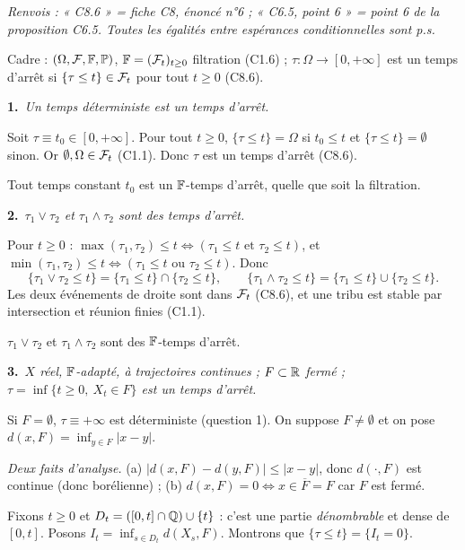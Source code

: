 \documentclass[11pt,a4paper]{article}
\newcommand{\question}[2]{\par\medskip\noindent\textbf{#1}~\textit{#2}\par\smallskip}
\begin{document}

\textit{Renvois : « C8.6 » = fiche C8, énoncé n°6 ; « C6.5, point 6 » = point 6 de la proposition C6.5. Toutes les égalités entre
espérances conditionnelles sont p.s.}

\begin{exo}
Cadre : $(\Omega,\mathcal{F},\mathbb{F},\mathbb{P})$, $\mathbb{F}=(\mathcal{F}_t)_{t\ge0}$ filtration (C1.6) ; $\tau:\Omega\to[0,+\infty]$ est un temps d'arrêt si
$\{\tau\le t\}\in\mathcal{F}_t$ pour tout $t\ge0$ (C8.6).

\question{1.}{Un temps déterministe est un temps d'arrêt.}
Soit $\tau\equiv t_0\in[0,+\infty]$. Pour tout $t\ge0$, $\{\tau\le t\}=\Omega$ si $t_0\le t$ et $\{\tau\le t\}=\emptyset$ sinon.
Or $\emptyset,\Omega\in\mathcal{F}_t$ (C1.1). Donc $\tau$ est un temps d'arrêt (C8.6).
\begin{resultat}Tout temps constant $t_0$ est un $\mathbb{F}$-temps d'arrêt, quelle que soit la filtration.\end{resultat}

\question{2.}{$\tau_1\vee\tau_2$ et $\tau_1\wedge\tau_2$ sont des temps d'arrêt.}
Pour $t\ge0$ : $\max(\tau_1,\tau_2)\le t\iff(\tau_1\le t\text{ et }\tau_2\le t)$, et $\min(\tau_1,\tau_2)\le t\iff(\tau_1\le t\text{ ou }\tau_2\le t)$. Donc
\[\{\tau_1\vee\tau_2\le t\}=\{\tau_1\le t\}\cap\{\tau_2\le t\},\qquad\{\tau_1\wedge\tau_2\le t\}=\{\tau_1\le t\}\cup\{\tau_2\le t\}.\]
Les deux événements de droite sont dans $\mathcal{F}_t$ (C8.6), et une tribu est stable par intersection et réunion finies (C1.1).
\begin{resultat}$\tau_1\vee\tau_2$ et $\tau_1\wedge\tau_2$ sont des $\mathbb{F}$-temps d'arrêt.\end{resultat}

\question{3.}{$X$ réel, $\mathbb{F}$-adapté, à trajectoires continues ; $F\subset\mathbb{R}$ fermé ; $\tau=\inf\{t\ge0,\ X_t\in F\}$ est un temps d'arrêt.}
Si $F=\emptyset$, $\tau\equiv+\infty$ est déterministe (question 1). On suppose $F\neq\emptyset$ et on pose $d(x,F)=\inf_{y\in F}|x-y|$.

\emph{Deux faits d'analyse.} (a) $|d(x,F)-d(y,F)|\le|x-y|$, donc $d(\cdot,F)$ est continue (donc borélienne) ;
(b) $d(x,F)=0\iff x\in\overline F=F$ car $F$ est fermé.

Fixons $t\ge0$ et $D_t=([0,t]\cap\mathbb{Q})\cup\{t\}$ : c'est une partie \emph{dénombrable} et dense de $[0,t]$. Posons
$I_t=\inf_{s\in D_t}d(X_s,F)$. Montrons que $\{\tau\le t\}=\{I_t=0\}$.


\end{exo}
\end{document}
